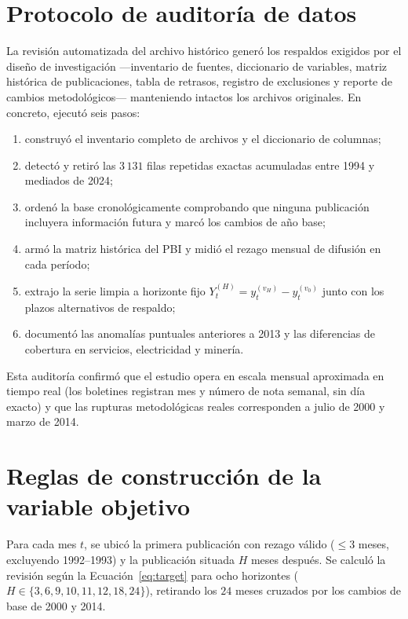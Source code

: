 \appendix

\section{Protocolo de auditoría de datos}
\label{app:auditoria}

La revisión automatizada del archivo histórico \parencite{cruz2025} generó los respaldos exigidos por el diseño de investigación —inventario de fuentes, diccionario de variables, matriz histórica de publicaciones, tabla de retrasos, registro de exclusiones y reporte de cambios metodológicos— manteniendo intactos los archivos originales. En concreto, ejecutó seis pasos:
\begin{enumerate}
	\item construyó el inventario completo de archivos y el diccionario de columnas;
	\item detectó y retiró las \(3\,131\) filas repetidas exactas acumuladas entre 1994 y mediados de 2024;
	\item ordenó la base cronológicamente comprobando que ninguna publicación incluyera información futura y marcó los cambios de año base;
	\item armó la matriz histórica del PBI y midió el rezago mensual de difusión en cada período;
	\item extrajo la serie limpia a horizonte fijo \(Y_t^{(H)} = y_t^{(v_H)} - y_t^{(v_0)}\) junto con los plazos alternativos de respaldo;
	\item documentó las anomalías puntuales anteriores a 2013 y las diferencias de cobertura en servicios, electricidad y minería.
\end{enumerate}
Esta auditoría confirmó que el estudio opera en escala mensual aproximada en tiempo real (los boletines registran mes y número de nota semanal, sin día exacto) y que las rupturas metodológicas reales corresponden a julio de 2000 y marzo de 2014.

\section{Reglas de construcción de la variable objetivo}
\label{app:objetivo}

Para cada mes \(t\), se ubicó la primera publicación con rezago válido (\(\le 3\) meses, excluyendo 1992--1993) y la publicación situada \(H\) meses después. Se calculó la revisión según la Ecuación~\ref{eq:target} para ocho horizontes (\(H \in \{3, 6, 9, 10, 11, 12, 18, 24\}\)), retirando los \(24\) meses cruzados por los cambios de base de 2000 y 2014.

